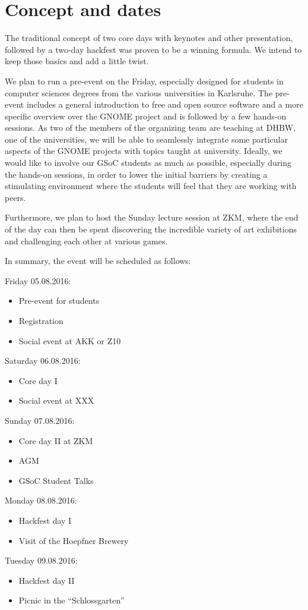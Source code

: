 
\section{Concept and dates}

The traditional concept of two core days with keynotes and other 
presentation, followed by a two-day hackfest was proven to be a winning 
formula. We intend to keep those basics and add a little twist.

We plan to run a pre-event on the Friday, especially designed for 
students in computer sciences degrees from the various universities in 
Karlsruhe. The pre-event includes a general introduction to free and 
open source software and a more specific overview over the GNOME 
project and is followed by a few hands-on sessions. As two of the 
members of the organizing team are teaching at DHBW, one of the 
universities, we will be able to seamlessly integrate some particular 
aspects of the GNOME projects with topics taught at university. 
Ideally, we would like to involve our GSoC students as much as 
possible, especially during the hands-on sessions, in order to lower 
the initial barriers by creating a stimulating environment where the 
students will feel that they are working with peers.

Furthermore, we plan to host the Sunday lecture session at ZKM, where 
the end of the day can then be spent discovering the incredible variety 
of art exhibitions and challenging each other at various games.

In summary, the event will be scheduled as follows:

Friday 05.08.2016:
\begin{itemize}
\item Pre-event for students
\item Registration
\item Social event at AKK or Z10
\end{itemize}

Saturday 06.08.2016:
\begin{itemize}
\item  Core day I
\item  Social event at XXX
\end{itemize}

Sunday 07.08.2016:
\begin{itemize}
\item  Core day II at ZKM
\item  AGM
\item  GSoC Student Talks
\end{itemize}

Monday 08.08.2016:
\begin{itemize}
\item  Hackfest day I
\item  Visit of the Hoepfner Brewery
\end{itemize}

Tuesday 09.08.2016:
\begin{itemize}
\item  Hackfest day II
\item  Picnic in the “Schlossgarten”
\end{itemize}

